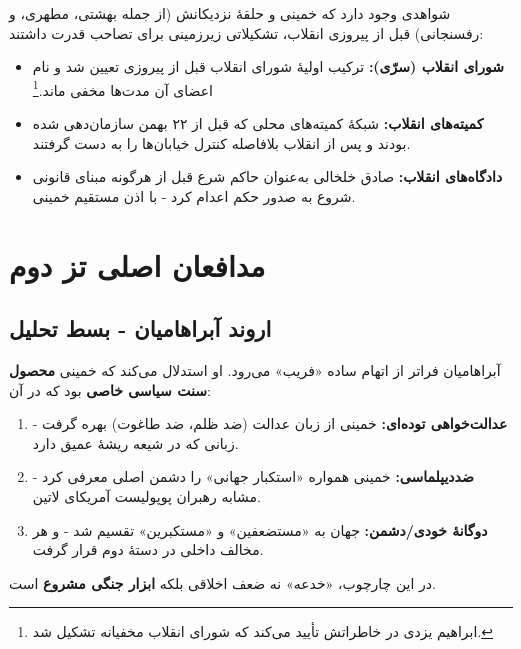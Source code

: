 \documentclass[12pt,a4paper]{book}
\newcommand{\keyword}[1]{\textbf{\textcolor{cPrimary}{#1}}}
\begin{document}
شواهدی وجود دارد که خمینی و حلقهٔ نزدیکانش (از جمله بهشتی، مطهری، و رفسنجانی) قبل از پیروزی انقلاب، تشکیلاتی زیرزمینی برای تصاحب قدرت داشتند:

\begin{itemize}[label=\textcolor{cAccent}{$\blacktriangleright$}, rightmargin=2em]
    \item \textbf{شورای انقلاب (سرّی):} ترکیب اولیهٔ شورای انقلاب قبل از پیروزی تعیین شد و نام اعضای آن مدت‌ها مخفی ماند.\footnote{ابراهیم یزدی در خاطراتش تأیید می‌کند که شورای انقلاب مخفیانه تشکیل شد.}
    \item \textbf{کمیته‌های انقلاب:} شبکهٔ کمیته‌های محلی که قبل از ۲۲ بهمن سازمان‌دهی شده بودند و پس از انقلاب بلافاصله کنترل خیابان‌ها را به دست گرفتند.
    \item \textbf{دادگاه‌های انقلاب:} صادق خلخالی به‌عنوان حاکم شرع قبل از هرگونه مبنای قانونی شروع به صدور حکم اعدام کرد - با اذن مستقیم خمینی.
\end{itemize}

\section{مدافعان اصلی تز دوم}

\subsection{اروند آبراهامیان - بسط تحلیل}

آبراهامیان فراتر از اتهام ساده «فریب» می‌رود. او استدلال می‌کند که خمینی \keyword{محصول سنت سیاسی خاصی} بود که در آن:

\begin{principleBox}
\begin{enumerate}[label=\textcolor{cPrimary}{\bfseries\arabic*.}, rightmargin=2em]
    \item \textbf{عدالت‌خواهی توده‌ای:} خمینی از زبان عدالت (ضد ظلم، ضد طاغوت) بهره گرفت - زبانی که در شیعه ریشهٔ عمیق دارد.
    \item \textbf{ضددیپلماسی:} خمینی همواره «استکبار جهانی» را دشمن اصلی معرفی کرد - مشابه رهبران پوپولیست آمریکای لاتین.
    \item \textbf{دوگانهٔ خودی/دشمن:} جهان به «مستضعفین» و «مستکبرین» تقسیم شد - و هر مخالف داخلی در دستهٔ دوم قرار گرفت.
\end{enumerate}

در این چارچوب، «خدعه» نه ضعف اخلاقی بلکه \keyword{ابزار جنگی مشروع} است.
\end{principleBox}
\end{document}
